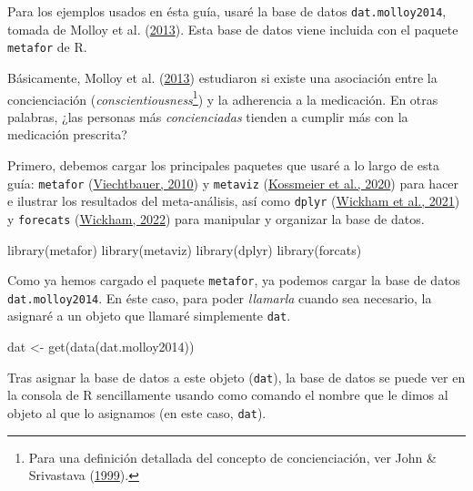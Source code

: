 \documentclass[
  bookmarksnumbered]{article}
\newenvironment{Shaded}{\begin{snugshade}}{\end{snugshade}}
\newcommand{\FunctionTok}[1]{\textcolor[rgb]{0.39,0.29,0.61}{#1}}
\newcommand{\NormalTok}[1]{\textcolor[rgb]{0.12,0.11,0.11}{#1}}
\newcommand{\OtherTok}[1]{\textcolor[rgb]{0.00,0.43,0.16}{#1}}
\begin{document}
Para los ejemplos usados en ésta guía, usaré la base de datos \texttt{dat.molloy2014}, tomada de Molloy et al. (\protect\hyperlink{ref-molloy2013}{2013}). Esta base de datos viene incluida con el paquete \texttt{metafor} de R.

Básicamente, Molloy et al. (\protect\hyperlink{ref-molloy2013}{2013}) estudiaron si existe una asociación entre la concienciación (\emph{conscientiousness}\footnote{Para una definición detallada del concepto de concienciación, ver John \& Srivastava (\protect\hyperlink{ref-johnBigFiveTrait1999}{1999}).}) y la adherencia a la medicación. En otras palabras, ¿las personas más \emph{concienciadas} tienden a cumplir más con la medicación prescrita?

Primero, debemos cargar los principales paquetes que usaré a lo largo de esta guía: \texttt{metafor} (\protect\hyperlink{ref-viechtbauer2010}{Viechtbauer, 2010}) y \texttt{metaviz} (\protect\hyperlink{ref-KossmeierMetaviz}{Kossmeier et al., 2020}) para hacer e ilustrar los resultados del meta-análisis, así como \texttt{dplyr} (\protect\hyperlink{ref-WickhamDplyr2021}{Wickham et al., 2021}) y \texttt{forecats} (\protect\hyperlink{ref-Wickhamforcats2022}{Wickham, 2022}) para manipular y organizar la base de datos.

\begin{Shaded}
\begin{Highlighting}[]
\FunctionTok{library}\NormalTok{(metafor)}
\FunctionTok{library}\NormalTok{(metaviz)}
\FunctionTok{library}\NormalTok{(dplyr)}
\FunctionTok{library}\NormalTok{(forcats)}
\end{Highlighting}
\end{Shaded}

Como ya hemos cargado el paquete \texttt{metafor}, ya podemos cargar la base de datos \texttt{dat.molloy2014}. En éste caso, para poder \emph{llamarla} cuando sea necesario, la asignaré a un objeto que llamaré simplemente \texttt{dat}.

\begin{Shaded}
\begin{Highlighting}[]
\NormalTok{dat }\OtherTok{\textless{}{-}} \FunctionTok{get}\NormalTok{(}\FunctionTok{data}\NormalTok{(dat.molloy2014))}
\end{Highlighting}
\end{Shaded}

Tras asignar la base de datos a este objeto (\texttt{dat}), la base de datos se puede ver en la consola de R sencillamente usando como comando el nombre que le dimos al objeto al que lo asignamos (en este caso, \texttt{dat}).
\end{document}
